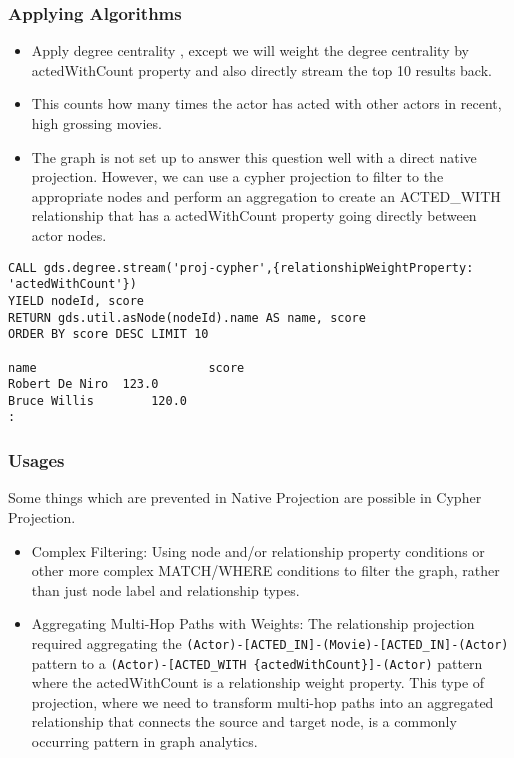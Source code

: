\begin{frame}[fragile]\frametitle{Applying Algorithms}

\begin{itemize}
\item Apply degree centrality , except we will weight the degree centrality by actedWithCount property and also directly stream the top 10 results back. 
\item This counts how many times the actor has acted with other actors in recent, high grossing movies.
\item The graph is not set up to answer this question well with a direct native projection. However, we can use a cypher projection to filter to the appropriate nodes and perform an aggregation to create an ACTED\_WITH relationship that has a actedWithCount property going directly between actor nodes.
\end{itemize}

\begin{lstlisting}
CALL gds.degree.stream('proj-cypher',{relationshipWeightProperty: 'actedWithCount'})
YIELD nodeId, score
RETURN gds.util.asNode(nodeId).name AS name, score
ORDER BY score DESC LIMIT 10

name						score
Robert De Niro 	123.0
Bruce Willis 		120.0
:
\end{lstlisting}

\end{frame}

\begin{frame}[fragile]\frametitle{Usages}

Some things which are prevented in Native Projection are possible in Cypher Projection.
 
\begin{itemize}
\item Complex Filtering: Using node and/or relationship property conditions or other more complex MATCH/WHERE conditions to filter the graph, rather than just node label and relationship types.
\item Aggregating Multi-Hop Paths with Weights: The relationship projection required aggregating the \lstinline|(Actor)-[ACTED_IN]-(Movie)-[ACTED_IN]-(Actor)| pattern to a \lstinline|(Actor)-[ACTED_WITH {actedWithCount}]-(Actor)| pattern where the actedWithCount is a relationship weight property. This type of projection, where we need to transform multi-hop paths into an aggregated relationship that connects the source and target node, is a commonly occurring pattern in graph analytics.
\end{itemize}


\end{frame}


